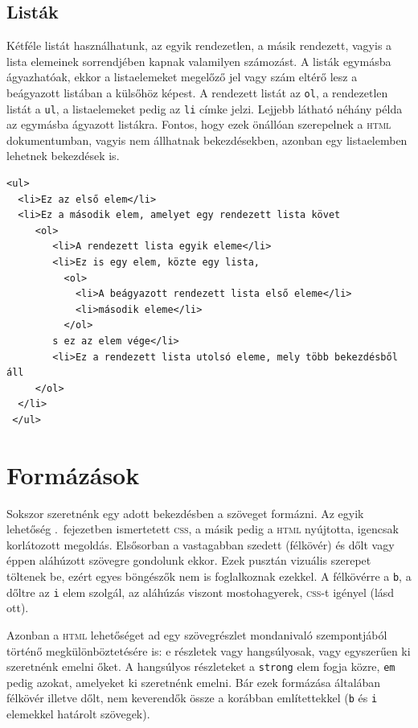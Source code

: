 \subsection{Listák}
Kétféle listát használhatunk, az egyik rendezetlen, a másik rendezett, vagyis a
lista elemeinek sorrendjében kapnak valamilyen számozást. A listák egymásba
ágyazhatóak, ekkor a listaelemeket megelőző jel vagy szám eltérő lesz a
beágyazott listában a külsőhöz képest. A rendezett listát az \texttt{ol}, a
rendezetlen listát a \texttt{ul}, a listaelemeket pedig az \texttt{li} címke
jelzi. Lejjebb látható néhány példa az egymásba ágyazott
listákra. Fontos, hogy ezek önállóan szerepelnek a \textsc{html} dokumentumban,
vagyis nem állhatnak bekezdésekben, azonban egy listaelemben lehetnek bekezdések
is.

\begin{Verbatim}[frame=single]
<ul>
  <li>Ez az első elem</li>
  <li>Ez a második elem, amelyet egy rendezett lista követ
     <ol>
        <li>A rendezett lista egyik eleme</li>
        <li>Ez is egy elem, közte egy lista,
          <ol>
            <li>A beágyazott rendezett lista első eleme</li>
            <li>második eleme</li>
          </ol>
        s ez az elem vége</li>        
        <li>Ez a rendezett lista utolsó eleme, mely több bekezdésből áll        
     </ol>
  </li>
 </ul> 
\end{Verbatim}




\section{Formázások}
Sokszor szeretnénk egy adott bekezdésben a szöveget formázni. Az egyik lehetőség
.\ fejezetben ismertetett \textsc{css}, a másik pedig a
\textsc{html} nyújtotta, igencsak korlátozott megoldás. Elsősorban a vastagabban
szedett (félkövér) és dőlt vagy éppen aláhúzott szövegre gondolunk ekkor. Ezek
pusztán vizuális szerepet töltenek be, ezért egyes böngészők nem is foglalkoznak
ezekkel. A félkövérre a \texttt{b}, a dőltre az \texttt{i} elem szolgál, az
aláhúzás viszont mostohagyerek, \textsc{css}-t igényel (lásd ott).

Azonban a \textsc{html} lehetőséget ad egy szövegrészlet mondanivaló
szempontjából történő megkülönböztetésére is: e részletek vagy hangsúlyosak,
vagy egyszerűen ki szeretnénk emelni őket.  A hangsúlyos részleteket a
\texttt{strong} elem fogja közre, \texttt{em} pedig azokat, amelyeket ki
szeretnénk emelni. Bár ezek formázása általában félkövér illetve dőlt, nem
keverendők össze a korábban említettekkel (\texttt{b} és \texttt{i}
elemekkel határolt szövegek).

